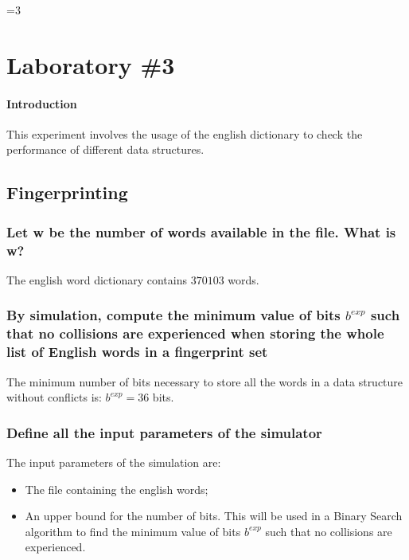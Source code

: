 \documentclass{report}
\newcounter{debug}
\begin{document}
			
			
\ifnum\value{debug}=3 {

\chapter{Laboratory \#3}
	 \subsubsection{Introduction}
				This experiment involves the usage of the english dictionary to check the performance of different data structures. 
	 
	 \section{Fingerprinting}	 
	 
			 	\subsection{Let w be the number of words available in the file. What is w?}
								The english word dictionary contains $370103$ words.
								
			 	\subsection{By simulation, compute the minimum value of bits $b^{exp}$ such that no collisions are experienced when storing the whole list of English words in a fingerprint set}
						The minimum number of bits necessary to store all the words in a data structure without conflicts is: $b^{exp} = 36$ bits.
						
				\subsection{Define all the input parameters of the simulator}
					The input parameters of the simulation are:
					\begin{itemize}
						\item The file containing the english words;
						\item An upper bound for the number of bits. This will be used in a Binary Search algorithm to find the minimum value of bits $b^{exp}$ such that no collisions are experienced.
					\end{itemize}
					 
}
\end{document}
